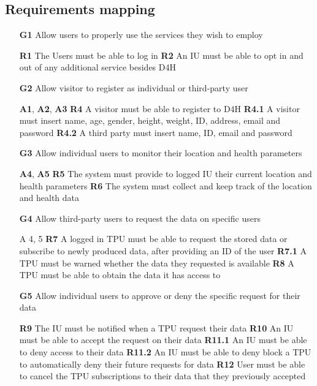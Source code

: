 \subsection{Requirements mapping}
\begin{itemize}
\item [\textbf{G1}] Allow users to properly use the services they wish to employ 

\subitem \textbf{R1} The Users must be able to log in 
\subitem \textbf{R2} An IU must be able to opt in and out of any additional service besides D4H

\item [\textbf{G2}] Allow visitor to register as individual or third-party user 

\subitem \textbf{A1}, \textbf{A2}, \textbf{A3}
\subitem \textbf{R4} A visitor must be able to register to D4H 
\subitem \textbf{R4.1} A visitor must insert name, age, gender, height, weight, ID, address, email and password
\subitem \textbf{R4.2} A third party must insert name, ID, email and password 

\item [\textbf{G3}] Allow individual users to monitor their location and health parameters 

\subitem \textbf{A4}, \textbf{A5}
\subitem \textbf{R5} The system must provide to logged IU their current location and health parameters
\subitem \textbf{R6} The system must collect and keep track of the location and health data

\item [\textbf{G4}] Allow third-party users to request the data on specific users

\subitem A 4, 5
\subitem \textbf{R7} A logged in TPU must be able to request the stored data or subscribe to newly produced data, after providing an ID of the user
\subitem \textbf{R7.1} A TPU must be warned whether the data they requested is available
\subitem \textbf{R8} A TPU must be able to obtain the data it has access to 

\item [\textbf{G5}] Allow individual users to approve or deny the specific request for their data

\subitem \textbf{R9} The IU must be notified when a TPU request their data
\subitem \textbf{R10} An IU must be able to accept the request on their data
\subitem \textbf{R11.1} An IU must be able to deny access to their data
\subitem \textbf{R11.2} An IU must be able to deny block a TPU to automatically deny their future requests for data
\subitem \textbf{R12} User must be able to cancel the TPU subscriptions to their data that they previously accepted


\end{itemize}
